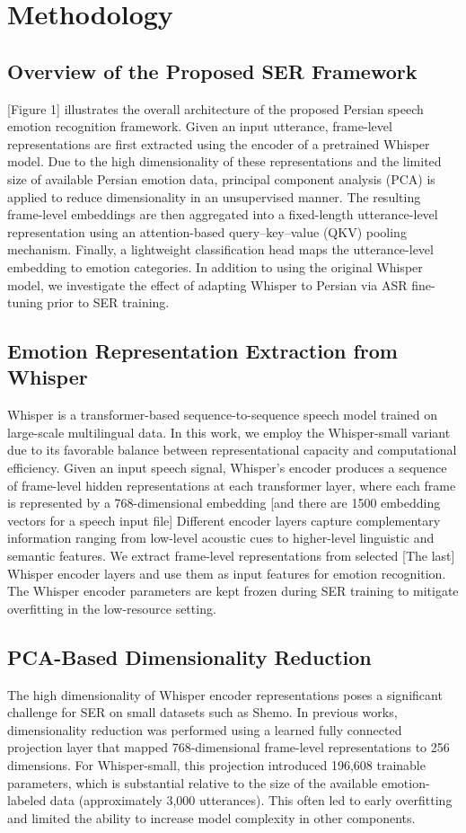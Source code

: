 \documentclass[conference]{IEEEtran}
\begin{document}
\section{Methodology}
\subsection{Overview of the Proposed SER Framework}
[Figure 1] illustrates the overall architecture of the proposed Persian speech emotion recognition framework. Given an input utterance, frame-level representations are first extracted using the encoder of a pretrained Whisper model. Due to the high dimensionality of these representations and the limited size of available Persian emotion data, principal component analysis (PCA) is applied to reduce dimensionality in an unsupervised manner. The resulting frame-level embeddings are then aggregated into a fixed-length utterance-level representation using an attention-based query–key–value (QKV) pooling mechanism. Finally, a lightweight classification head maps the utterance-level embedding to emotion categories. In addition to using the original Whisper model, we investigate the effect of adapting Whisper to Persian via ASR fine-tuning prior to SER training.
\subsection{Emotion Representation Extraction from Whisper}
Whisper is a transformer-based sequence-to-sequence speech model trained on large-scale multilingual data. In this work, we employ the Whisper-small variant due to its favorable balance between representational capacity and computational efficiency. Given an input speech signal, Whisper’s encoder produces a sequence of frame-level hidden representations at each transformer layer, where each frame is represented by a 768-dimensional embedding [and there are 1500 embedding vectors for a speech input file]
Different encoder layers capture complementary information ranging from low-level acoustic cues to higher-level linguistic and semantic features. We extract frame-level representations from selected [The last] Whisper encoder layers and use them as input features for emotion recognition. The Whisper encoder parameters are kept frozen during SER training to mitigate overfitting in the low-resource setting.
\subsection{PCA-Based Dimensionality Reduction}
The high dimensionality of Whisper encoder representations poses a significant challenge for SER on small datasets such as Shemo. In previous works, dimensionality reduction was performed using a learned fully connected projection layer that mapped 768-dimensional frame-level representations to 256 dimensions. For Whisper-small, this projection introduced 196,608 trainable parameters, which is substantial relative to the size of the available emotion-labeled data (approximately 3,000 utterances). This often led to early overfitting and limited the ability to increase model complexity in other components.
\end{document}
